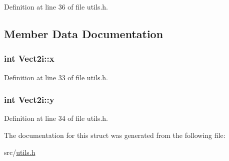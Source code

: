 Definition at line 36 of file utils.\-h.



\subsection{Member Data Documentation}
\hypertarget{struct_vect2i_ae76ced0cba575b16f9de72e78828122b}{
\subsubsection[{x}]{\setlength{\rightskip}{0pt plus 5cm}int Vect2i\-::x}}\label{struct_vect2i_ae76ced0cba575b16f9de72e78828122b}


Definition at line 33 of file utils.\-h.

\hypertarget{struct_vect2i_a32d99812cd2cccca2b9751259783b699}{
\subsubsection[{y}]{\setlength{\rightskip}{0pt plus 5cm}int Vect2i\-::y}}\label{struct_vect2i_a32d99812cd2cccca2b9751259783b699}


Definition at line 34 of file utils.\-h.



The documentation for this struct was generated from the following file\-:\begin{DoxyCompactItemize}
\item 
src/\hyperlink{utils_8h}{utils.\-h}\end{DoxyCompactItemize}
